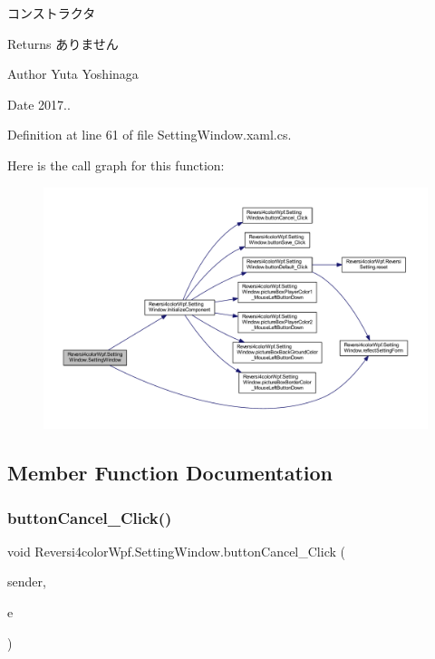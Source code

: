 コンストラクタ 

\begin{DoxyReturn}{Returns}
ありません 
\end{DoxyReturn}
\begin{DoxyAuthor}{Author}
Yuta Yoshinaga 
\end{DoxyAuthor}
\begin{DoxyDate}{Date}
2017.. 
\end{DoxyDate}


Definition at line 61 of file Setting\+Window.\+xaml.\+cs.

Here is the call graph for this function\+:
\nopagebreak
\begin{figure}[H]
\begin{center}
\leavevmode
\includegraphics[width=350pt]{class_reversi4color_wpf_1_1_setting_window_ae883aa7c069151f5115dfc35f30aa81c_cgraph}
\end{center}
\end{figure}


\subsection{Member Function Documentation}
\mbox{\label{class_reversi4color_wpf_1_1_setting_window_afbcd7dd27bd8a753ef2d9f991880db6b}} 
\subsubsection{\texorpdfstring{button\+Cancel\+\_\+\+Click()}{buttonCancel\_Click()}}
{\footnotesize\ttfamily void Reversi4color\+Wpf.\+Setting\+Window.\+button\+Cancel\+\_\+\+Click (\begin{DoxyParamCaption}\item[{object}]{sender,  }\item[{Routed\+Event\+Args}]{e }\end{DoxyParamCaption})\hspace{0.3cm}{\ttfamily [private]}}



